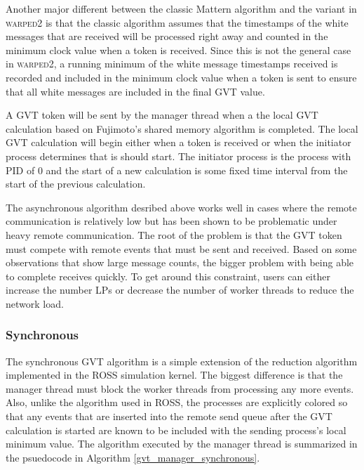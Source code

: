 \documentclass[11pt]{book}
\begin{document}
Another major different between the classic Mattern algorithm and the variant in \textsc{warped2} is
that the classic algorithm assumes that the timestamps of the white messages that are received will
be processed right away and counted in the minimum clock value when a token is received.  Since this
is not the general case in \textsc{warped2}, a running minimum of the white message timestamps
received is recorded and included in the minimum clock value when a token is sent to ensure that all
white messages are included in the final GVT value.

A GVT token will be sent by the manager thread when a the local GVT calculation based on Fujimoto's
shared memory algorithm \cite{fujimoto-94} is completed.  The local GVT calculation will begin
either when a token is received or when the initiator process determines that is should start.  The
initiator process is the process with PID of 0 and the start of a new calculation is some fixed time
interval from the start of the previous calculation.

The asynchronous algorithm desribed above works well in cases where the remote communication is
relatively low but has been shown to be problematic under heavy remote communication.  The root of
the problem is that the GVT token must compete with remote events that must be sent and received.
Based on some observations that show large message counts, the bigger problem with being able to
complete receives quickly.  To get around this constraint, users can either increase the number LPs
or decrease the number of worker threads to reduce the network load.

\subsubsection{Synchronous}

The synchronous GVT algorithm is a simple extension of the reduction algorithm implemented in the
ROSS simulation kernel.  The biggest difference is that the manager thread must block the worker
threads from processing any more events.  Also, unlike the algorithm used in ROSS, the processes are
explicitly colored so that any events that are inserted into the remote send queue after the GVT
calculation is started are known to be included with the sending process's local minimum value.  The
algorithm executed by the manager thread is summarized in the psuedocode in Algorithm
\ref{gvt_manager_synchronous}.
\end{document}

